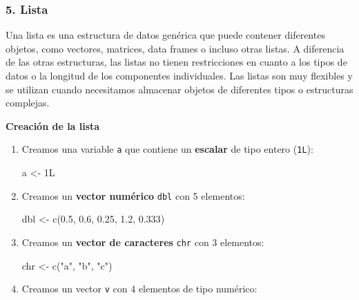 \documentclass[
  letterpaper,
  DIV=11,
  numbers=noendperiod]{scrartcl}
\newenvironment{Shaded}{}{}
\newcommand{\FloatTok}[1]{\textcolor[rgb]{0.00,0.36,0.77}{#1}}
\newcommand{\FunctionTok}[1]{\textcolor[rgb]{0.44,0.26,0.76}{#1}}
\newcommand{\NormalTok}[1]{\textcolor[rgb]{0.14,0.16,0.18}{#1}}
\newcommand{\OtherTok}[1]{\textcolor[rgb]{0.44,0.26,0.76}{#1}}
\newcommand{\StringTok}[1]{\textcolor[rgb]{0.01,0.18,0.38}{#1}}
\begin{document}
\hypertarget{lista}{%
\subsubsection{5. Lista}\label{lista}}

Una lista es una estructura de datos genérica que puede contener
diferentes objetos, como vectores, matrices, data frames o incluso otras
listas. A diferencia de las otras estructuras, las listas no tienen
restricciones en cuanto a los tipos de datos o la longitud de los
componentes individuales. Las listas son muy flexibles y se utilizan
cuando necesitamos almacenar objetos de diferentes tipos o estructuras
complejas.

\textbf{Creación de la lista}

\begin{enumerate}
\def\labelenumi{\arabic{enumi}.}
\item
  Creamos una variable \texttt{a} que contiene un \textbf{escalar} de
  tipo entero (\texttt{1L}):

\begin{Shaded}
\begin{Highlighting}[]
\NormalTok{a }\OtherTok{\textless{}{-}}\NormalTok{ 1L}
\end{Highlighting}
\end{Shaded}
\item
  Creamos un \textbf{vector numérico} \texttt{dbl} con 5 elementos:

\begin{Shaded}
\begin{Highlighting}[]
\NormalTok{dbl }\OtherTok{\textless{}{-}} \FunctionTok{c}\NormalTok{(}\FloatTok{0.5}\NormalTok{, }\FloatTok{0.6}\NormalTok{, }\FloatTok{0.25}\NormalTok{, }\FloatTok{1.2}\NormalTok{, }\FloatTok{0.333}\NormalTok{)}
\end{Highlighting}
\end{Shaded}
\item
  Creamos un \textbf{vector de caracteres} \texttt{chr} con 3 elementos:

\begin{Shaded}
\begin{Highlighting}[]
\NormalTok{chr }\OtherTok{\textless{}{-}} \FunctionTok{c}\NormalTok{(}\StringTok{"a"}\NormalTok{, }\StringTok{"b"}\NormalTok{, }\StringTok{"c"}\NormalTok{)}
\end{Highlighting}
\end{Shaded}
\item
  Creamos un vector \texttt{v} con 4 elementos de tipo numérico:


\end{enumerate}
\end{document}
